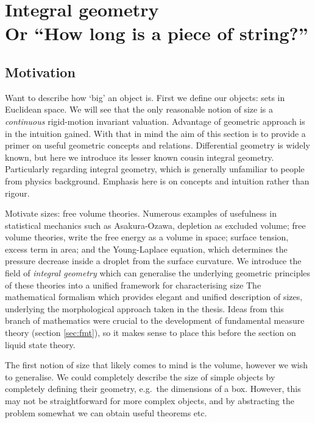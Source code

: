 \section[Integral geometry. Or ``How long is a piece of string?'']{Integral geometry\\ {\large Or ``How long is a piece of string?''}}
\label{sec:integral-geometry}

\subsection{Motivation}

Want to describe how `big' an object is.
First we define our objects: sets in Euclidean space.
We will see that the only reasonable notion of size is a \emph{continuous} rigid-motion invariant valuation.
Advantage of geometric approach is in the intuition gained.
With that in mind the aim of this section is to provide a primer on useful geometric concepts and relations.
Differential geometry is widely known, but here we introduce its lesser known cousin integral geometry.
Particularly regarding integral geometry, which is generally unfamiliar to people from physics background.
Emphasis here is on concepts and intuition rather than rigour.

Motivate sizes: free volume theories.
Numerous examples of usefulness in statistical mechanics such as Asakura-Ozawa, depletion as excluded volume; free volume theories, write the free energy as a volume in space; surface tension, excess term in area; and the Young-Laplace equation, which determines the pressure decrease inside a droplet from the surface curvature.
We introduce the field of \emph{integral geometry} which can generalise the underlying geometric principles of these theories into a unified framework for characterising size
The mathematical formalism which provides elegant and unified description of sizes, underlying the morphological approach taken in the thesis.
Ideas from this branch of mathematics were crucial to the development of fundamental measure theory (section \ref{sec:fmt}), so it makes sense to place this before the section on liquid state theory.

The first notion of size that likely comes to mind is the volume, however we wish to generalise.
We could completely describe the size of simple objects by completely defining their geometry, e.g.\ the dimensions of a box.
However, this may not be straightforward for more complex objects, and by abstracting the problem somewhat we can obtain useful theorems etc.

